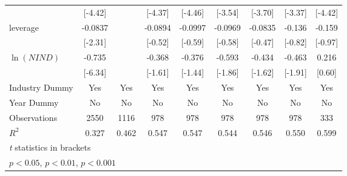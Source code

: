{\begin{tabular}{l*{8}{c}}
                    &     [-4.42]         &                     &     [-4.37]         &     [-4.46]         &     [-3.54]         &     [-3.70]         &     [-3.37]         &     [-4.42]         \\
[1em]
leverage            &     -0.0837         &                     &     -0.0894         &     -0.0997         &     -0.0969         &     -0.0835         &      -0.136         &      -0.159         \\
                    &     [-2.31]         &                     &     [-0.52]         &     [-0.59]         &     [-0.58]         &     [-0.47]         &     [-0.82]         &     [-0.97]         \\
[1em]
 $ \ln(NIND) $      &      -0.735\sym{**} &                     &      -0.368         &      -0.376         &      -0.593         &      -0.434         &      -0.463         &       0.216         \\
                    &     [-6.34]         &                     &     [-1.61]         &     [-1.44]         &     [-1.86]         &     [-1.62]         &     [-1.91]         &      [0.60]         \\
\hline
Industry Dummy      &         Yes         &         Yes         &         Yes         &         Yes         &         Yes         &         Yes         &         Yes         &         Yes         \\
Year Dummy          &          No         &          No         &          No         &          No         &          No         &          No         &          No         &          No         \\
Observations        &        2550         &        1116         &         978         &         978         &         978         &         978         &         978         &         333         \\
$ R^2 $             &       0.327         &       0.462         &       0.547         &       0.547         &       0.544         &       0.546         &       0.550         &       0.599         \\
\hline\hline
\multicolumn{9}{l}{\footnotesize \textit{t} statistics in brackets}\\
\multicolumn{9}{l}{\footnotesize \sym{*} \(p<0.05\), \sym{**} \(p<0.01\), \sym{***} \(p<0.001\)}\\
\end{tabular}
}
